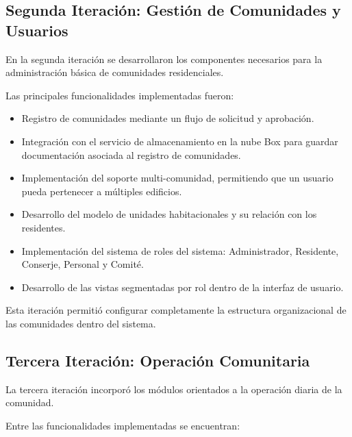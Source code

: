 \subsection{Segunda Iteración: Gestión de Comunidades y Usuarios}

En la segunda iteración se desarrollaron los componentes necesarios para la administración básica de comunidades residenciales.

Las principales funcionalidades implementadas fueron:

\begin{itemize}

\item Registro de comunidades mediante un flujo de solicitud y aprobación.

\item Integración con el servicio de almacenamiento en la nube Box para guardar documentación asociada al registro de comunidades.

\item Implementación del soporte multi-comunidad, permitiendo que un usuario pueda pertenecer a múltiples edificios.

\item Desarrollo del modelo de unidades habitacionales y su relación con los residentes.

\item Implementación del sistema de roles del sistema: Administrador, Residente, Conserje, Personal y Comité.

\item Desarrollo de las vistas segmentadas por rol dentro de la interfaz de usuario.

\end{itemize}

Esta iteración permitió configurar completamente la estructura organizacional de las comunidades dentro del sistema.

\subsection{Tercera Iteración: Operación Comunitaria}

La tercera iteración incorporó los módulos orientados a la operación diaria de la comunidad.

Entre las funcionalidades implementadas se encuentran:

